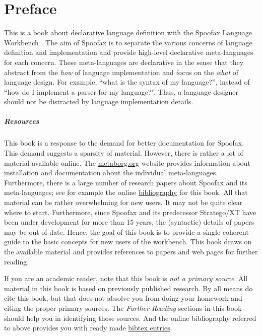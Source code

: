 \chapter*{Preface}

This is a book about declarative language definition with the Spoofax Language
Workbench \cite{KatsV10}.
The aim of Spoofax is to separate the various concerns of language definition
and implementation and provide high-level declarative meta-languages for each
concern.
These meta-languages are declarative in the sense that they abstract from the
\emph{how} of language implementation and focus on the \emph{what} of language
design.
For example, ``what is the syntax of my language?'', instead of ``how do I
implement a parser for my language?''.
Thus, a language designer should not be distracted by language implementation
details. 

\paragraph{Resources}

This book is a response to the demand for better documentation for Spoofax. This
demand suggests a sparsity of material.
However, there is rather a lot of material available online. The
\href{http://metaborg.org}{metaborg.org} website provides information about
installation and documentation about the individual meta-languages. 
Furthermore, there is a large number of research papers about Spoofax and its
meta-languages; see for example the online
\href{http://researchr.org/bibliography/metaborg-book/publications}{bibliography}
for this book.
All that material can be rather overwhelming for new users. 
It may not be quite clear where to start.
Furthermore, since Spoofax and its predecessor Stratego/XT have been
under development for more than 15 years, the (syntactic) details of
papers may be out-of-date.
Hence, the goal of this book is to provide a single coherent guide to the basic
concepts for new users of the workbench.
This book draws on the available material and provides references to papers and
web pages for further reading.

If you are an academic reader, note that this book is \emph{not a primary
source}. All material in this book is based on previously published research. By
all means do cite this book, but that does not absolve you from doing
your homework and citing the proper primary sources. The \emph{Further Reading}
sections in this book should help you in identifying those sources. And the
online bibliography referred to above provides you with ready made
\href{http://researchr.org/downloadbibtex/bibliography/metaborg-book}{bibtex
entries}.


